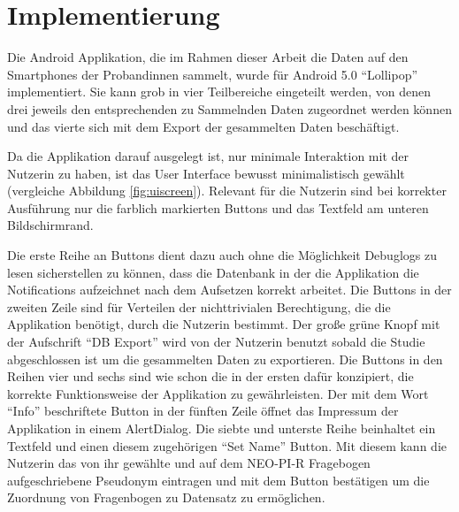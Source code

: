 
\chapter{Implementierung}
\label{ch:Implementierung}
Die Android Applikation, die im Rahmen dieser Arbeit die Daten auf den Smartphones der Probandinnen sammelt, wurde für Android 5.0 "`Lollipop"' implementiert.
Sie kann grob in vier Teilbereiche eingeteilt werden, von denen drei jeweils den entsprechenden zu Sammelnden Daten zugeordnet werden können und das vierte sich mit dem Export der gesammelten Daten beschäftigt.

Da die Applikation darauf ausgelegt ist, nur minimale Interaktion mit der Nutzerin zu haben,
ist das User Interface bewusst minimalistisch gewählt (vergleiche Abbildung \ref{fig:uiscreen}).
Relevant für die Nutzerin sind bei korrekter Ausführung nur die farblich markierten Buttons und das Textfeld am unteren Bildschirmrand.

Die erste Reihe an Buttons dient dazu auch ohne die Möglichkeit Debuglogs zu lesen sicherstellen zu können, dass die Datenbank in der die Applikation die Notifications aufzeichnet nach dem Aufsetzen korrekt arbeitet.
Die Buttons in der zweiten Zeile sind für Verteilen der nichttrivialen Berechtigung, die die Applikation benötigt, durch die Nutzerin bestimmt.
Der große grüne Knopf mit der Aufschrift "`DB Export"' wird von der Nutzerin benutzt sobald die Studie abgeschlossen ist um die gesammelten Daten zu exportieren.
Die Buttons in den Reihen vier und sechs sind wie schon die in der ersten dafür konzipiert, die korrekte Funktionsweise der Applikation zu gewährleisten.
Der mit dem Wort "`Info"' beschriftete Button in der fünften Zeile öffnet das Impressum der Applikation in einem AlertDialog.
Die siebte und unterste Reihe beinhaltet ein Textfeld und einen diesem zugehörigen "`Set Name"' Button.
Mit diesem kann die Nutzerin das von ihr gewählte und auf dem NEO-PI-R Fragebogen aufgeschriebene Pseudonym eintragen und mit dem Button bestätigen um die Zuordnung von Fragenbogen zu Datensatz zu ermöglichen.

